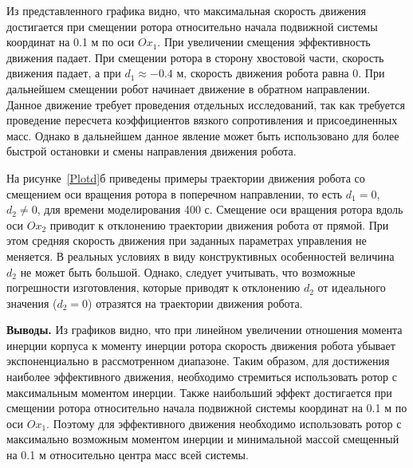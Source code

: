 Из представленного графика видно, что максимальная скорость движения достигается при смещении ротора относительно начала подвижной системы координат на 0.1 м по оси $ Ox_1 $. При увеличении смещения эффективность движения падает. При смещении ротора в сторону хвостовой части, скорость движения падает, а при $ d_1\approx-0.4 $ м, скорость движения робота равна 0. При дальнейшем смещении робот начинает движение в обратном направлении. Данное движение требует проведения отдельных исследований, так как требуется проведение пересчета коэффициентов вязкого сопротивления и присоединенных масс. Однако в дальнейшем данное явление может быть использовано для более быстрой остановки и смены направления движения робота.

На рисунке~\ref{Plotd}б приведены примеры траектории движения робота со смещением оси вращения ротора в поперечном направлении, то есть $ d_1 = 0 $, $ d_2 \neq 0 $, для времени моделирования 400 с. Смещение оси вращения ротора вдоль оси $ Ox_2 $ приводит к отклонению траектории движения робота от прямой. При этом средняя скорость движения при заданных параметрах управления не меняется. В реальных условиях в виду конструктивных особенностей величина $ d_2 $ не может быть большой. Однако, следует учитывать, что возможные погрешности изготовления, которые приводят к отклонению $ d_2 $ от идеального значения ($ d_2 = 0 $) отразятся на траектории движения робота.



\textbf{Выводы.} 
Из графиков видно, что при линейном увеличении отношения момента инерции корпуса к моменту инерции ротора скорость движения робота убывает экспоненциально в рассмотренном диапазоне. Таким образом, для достижения наиболее эффективного движения, необходимо стремиться использовать ротор с максимальным моментом инерции. Также наибольший эффект достигается при смещении ротора относительно начала подвижной системы координат на 0.1 м по оси $ Ox_1 $. Поэтому для эффективного движения необходимо использовать ротор с максимально возможным моментом инерции и минимальной массой смещенный на 0.1 м относительно центра масс всей системы.

